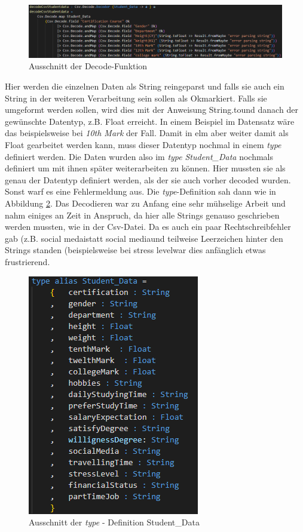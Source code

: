 \documentclass[usegeometry=true]{scrartcl}
\begin{document}
\begin{figure}[h]
\begin{center}
	\includegraphics[scale=.5]{decode.png}
	\caption{Ausschnitt der Decode-Funktion}
	\label{Decode}
\end{center}
\end{figure}

\noindent Hier werden die einzelnen Daten als String reingeparst und falls sie auch ein String in der weiteren Verarbeitung sein sollen als \glqq Ok\grqq markiert. Falls sie umgeformt werden sollen, wird dies mit der Anweisung \glqq String.to\grqq und danach der gewünschte Datentyp, z.B. Float erreicht. In einem Beispiel im Datensatz wäre das beispielsweise bei \textit{10th Mark} der Fall. Damit in elm aber weiter damit als Float gearbeitet werden kann, muss dieser Datentyp nochmal in einem \textit{type} definiert werden. Die Daten wurden also im \textit{type} \textit{Student\_Data} nochmals definiert um mit ihnen später weiterarbeiten zu können. Hier mussten sie als genau der Datentyp definiert werden, als der sie auch vorher decoded wurden. Sonst warf es eine Fehlermeldung aus. Die \textit{type}-Definition sah dann wie in Abbildung \ref{Type}. Das Decodieren war zu Anfang eine sehr mühselige Arbeit und nahm einiges an Zeit in Anspruch, da hier alle Strings genauso geschrieben werden mussten, wie in der Csv-Datei. Da es auch ein paar Rechtschreibfehler gab (z.B. \glqq social medai\grqq statt \glqq social media\grqq und teilweise Leerzeichen hinter den Strings standen (beispielsweise bei \glqq stress level\grqq war dies anfänglich etwas frustrierend. 



\begin{figure}[h]
\begin{center}
	\includegraphics[scale=.75]{typeDef.png}
	\caption{Ausschnitt der \textit{type} - Definition Student\_Data}
	\label{Type}
\end{center}
\end{figure}
\end{document}
